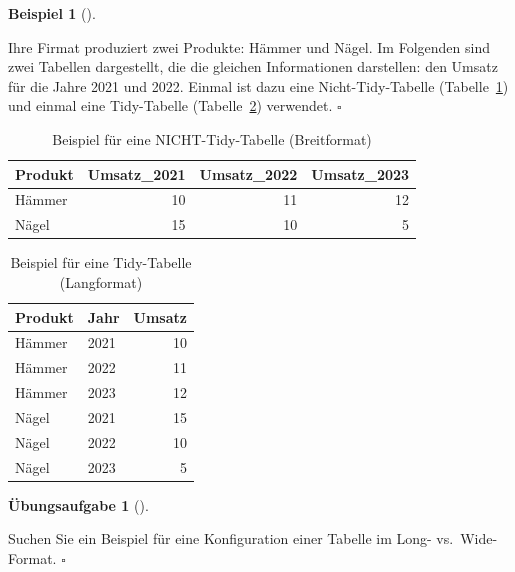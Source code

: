 \documentclass[
  letterpaper,
]{scrbook}
\theoremstyle{definition}
\newtheorem{example}{Beispiel}[chapter]
\theoremstyle{definition}
\theoremstyle{definition}
\newtheorem{exercise}{Übungsaufgabe}[chapter]
\theoremstyle{remark}
\begin{document}
\begin{example}[]\protect\hypertarget{exm-widelong}{}\label{exm-widelong}

Ihre Firmat produziert zwei Produkte: Hämmer und Nägel. Im Folgenden
sind zwei Tabellen dargestellt, die die gleichen Informationen
darstellen: den Umsatz für die Jahre 2021 und 2022. Einmal ist dazu eine
Nicht-Tidy-Tabelle (Tabelle~\ref{tbl-untidy1}) und einmal eine
Tidy-Tabelle (Tabelle~\ref{tbl-tidy1}) verwendet. \(\square\)

\end{example}

\begin{longtable}[]{@{}lrrr@{}}

\caption{\label{tbl-untidy1}Beispiel für eine NICHT-Tidy-Tabelle
(Breitformat)}

\tabularnewline

\toprule\noalign{}
Produkt & Umsatz\_2021 & Umsatz\_2022 & Umsatz\_2023 \\
\midrule\noalign{}
\endhead
\bottomrule\noalign{}
\endlastfoot
Hämmer & 10 & 11 & 12 \\
Nägel & 15 & 10 & 5 \\

\end{longtable}

\begin{longtable}[]{@{}llr@{}}

\caption{\label{tbl-tidy1}Beispiel für eine Tidy-Tabelle (Langformat)}

\tabularnewline

\toprule\noalign{}
Produkt & Jahr & Umsatz \\
\midrule\noalign{}
\endhead
\bottomrule\noalign{}
\endlastfoot
Hämmer & 2021 & 10 \\
Hämmer & 2022 & 11 \\
Hämmer & 2023 & 12 \\
Nägel & 2021 & 15 \\
Nägel & 2022 & 10 \\
Nägel & 2023 & 5 \\

\end{longtable}

\begin{exercise}[]\protect\hypertarget{exr-widelong}{}\label{exr-widelong}

Suchen Sie ein Beispiel für eine Konfiguration einer Tabelle im Long-
vs.~Wide-Format. \(\square\)

\end{exercise}
\end{document}
